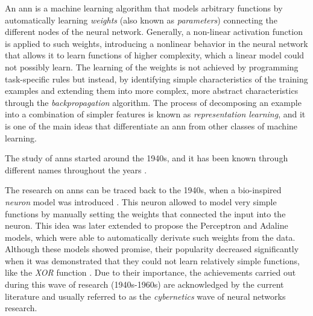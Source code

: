 

An \gls{ann} is a machine learning algorithm that models
arbitrary functions by automatically learning \emph{weights}
(also known as \emph{parameters}) connecting the different
nodes of the neural network. Generally, a non-linear
activation function is applied to such weights, introducing
a nonlinear behavior in the neural network that allows it to
learn functions of higher complexity, which a linear model
could not possibly learn. The learning of the weights is not
achieved by programming task-specific rules but instead, by
identifying simple characteristics of the training examples
and extending them into more complex, more abstract
characteristics through the \emph{backpropagation}
algorithm. The process of decomposing an example into a
combination of simpler features is known as
\emph{representation learning}, and it is one of the main
ideas that differentiate an \gls{ann} from other classes of
machine learning.

The study of \glspl{ann} started around the 1940s, and it
has been known through different names throughout the years
\parencite{goodfellow2016deep}.

The research on \glspl{ann} can be traced back to the 1940s,
when a bio-inspired \emph{neuron} model was introduced
\parencite{mcculloch1943logical}. This neuron allowed to
model very simple functions by manually setting the weights
that connected the input into the neuron. This idea was
later extended to propose the Perceptron
\parencite{rosenblatt1958perceptron} and Adaline
\parencite{widrow1960adaptive} models, which were able to
automatically derivate such weights from the data. Although
these models showed promise, their popularity decreased
significantly when it was demonstrated that they could not
learn relatively simple functions, like the \emph{XOR}
function \parencite{minsky1972perceptrons}. Due to their
importance, the achievements carried out during this wave of
research (1940s-1960s) are acknowledged by the current
literature \parencite{goodfellow2016deep} and usually
referred to as the \emph{cybernetics} wave of neural
networks research.

